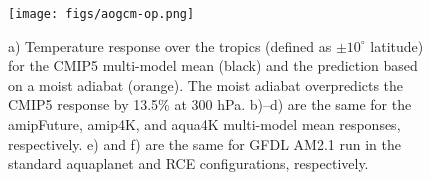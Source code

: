 \documentclass{ametsocV5}
\begin{document}
%

%

\begin{figure}
\centering
\texttt{[image: figs/aogcm-op.png]}
\caption{a) Temperature response over the tropics (defined as $\pm 10^\circ$ latitude) for the CMIP5 multi-model mean (black) and the prediction based on a moist adiabat (orange). The moist adiabat overpredicts the CMIP5 response by 13.5\% at 300 hPa. b)--d) are the same for the amipFuture, amip4K, and aqua4K multi-model mean responses, respectively. e) and f) are the same for GFDL AM2.1 run in the standard aquaplanet and RCE configurations, respectively.}
\label{fig:aogcm-op}
\end{figure}
\end{document}

